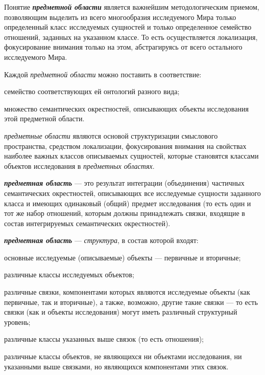 Понятие \textit{\textbf{предметной области}} является важнейшим методологическим приемом, позволяющим выделить из всего многообразия исследуемого Мира только определенный класс исследуемых сущностей и только определенное семейство отношений, заданных на указанном классе. То есть осуществляется локализация, фокусирование внимания только на этом, абстрагируясь от всего остального исследуемого Мира.

Каждой \textit{предметной области} можно поставить в соответствие:
\begin{textitemize}
	\item {семейство соответствующих ей онтологий разного вида};
	\item {множество семантических окрестностей, описывающих объекты исследования этой предметной области}.
\end{textitemize}

\textit{предметные области} являются основой структуризации смыслового пространства, средством локализации, фокусирования внимания на свойствах наиболее важных классов описываемых сущностей, которые становятся классами объектов исследования в \textit{предметных областях}.

\begin{SCn}
\end{SCn}	

\bigskip
\textbf{\textit{предметная область}} --- это результат интеграции (объединения) частичных семантических окрестностей, описывающих все исследуемые сущности заданного класса и имеющих одинаковый (общий) предмет исследования (то есть один и тот же набор отношений, которым должны принадлежать связки, входящие в состав интегрируемых семантических окрестностей).

\textbf{\textit{предметная область}} --- \textit{структура}, в состав которой входят:
\begin{textitemize}
	\item основные исследуемые (описываемые) объекты --- первичные и вторичные;
	\item различные классы исследуемых объектов;
	\item различные связки, компонентами которых являются исследуемые объекты (как первичные, так и вторичные), а также, возможно, другие такие связки --- то есть связки (как и объекты исследования) могут иметь различный структурный уровень;
	\item различные классы указанных выше связок (то есть отношения);
	\item различные классы объектов, не являющихся ни объектами исследования, ни указанными выше связками, но являющихся компонентами этих связок.
\end{textitemize}


